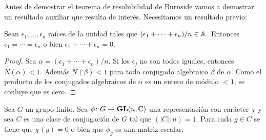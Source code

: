 %

Antes de demostrar el teorema de resolubilidad de Burnside vamos a demostrar un
resultado auxiliar que resulta de interés. Necesitamos un resultado previo:

\begin{lemma}
	\label{lem:4Burnside}
	Sean $\epsilon_1,\dots,\epsilon_n$ raíces de la unidad tales que
	$(\epsilon_1+\cdots+\epsilon_n)/n\in\mathbb{A}$. Entonces
	$\epsilon_1=\cdots=\epsilon_n$ o bien $\epsilon_1+\cdots+\epsilon_n=0$.
\end{lemma}


\begin{proof}
	Sea $\alpha=(\epsilon_1+\cdots+\epsilon_n)/n$.
	Si los $\epsilon_j$ no son todos iguales, entonces $N(\alpha)<1$. Además 
	$N(\beta)<1$ para todo conjugado algebraico $\beta$ de $\alpha$. Como el
	producto de los conjugados algebraicos de $\alpha$ es un entero de módulo
	$<1$, se conluye que es cero.
\end{proof}

\begin{theorem}[Burnside]
	\label{thm:Burnside_auxiliar}
	Sea $G$ un grupo finito. Sea $\phi\colon G\to\mathbf{GL}(n,\mathbb{C})$ una representación
	con carácter $\chi$ y sea $C$ es una clase de conjugación de $G$ tal que 
	$(|C|:n)=1$. Para cada $g\in C$ se tiene que $\chi(g)=0$ o bien que $\phi_g$ es una matriz
	escalar. 
\end{theorem}

